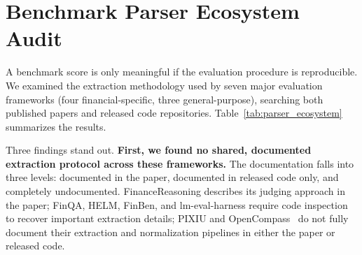 \section{Benchmark Parser Ecosystem Audit}
\label{sec:parser_audit}

A benchmark score is only meaningful if the evaluation procedure is reproducible. We examined the extraction methodology used by seven major evaluation frameworks (four financial-specific, three general-purpose), searching both published papers and released code repositories. Table~\ref{tab:parser_ecosystem} summarizes the results.

\begin{table}[htb!]
\caption{Answer extraction methods across seven major LLM evaluation frameworks. Documentation status: Paper (described in the paper), Code only (discoverable only in released code), Undocumented (not fully specified in either).}
\label{tab:parser_ecosystem}
\centering
{}
\end{table}

Three findings stand out. \textbf{First, we found no shared, documented extraction protocol across these frameworks.} The documentation falls into three levels: documented in the paper, documented in released code only, and completely undocumented. FinanceReasoning describes its judging approach in the paper; FinQA, HELM, FinBen, and lm-eval-harness require code inspection to recover important extraction details; PIXIU and OpenCompass~\cite{opencompass2023} do not fully document their extraction and normalization pipelines in either the paper or released code.

